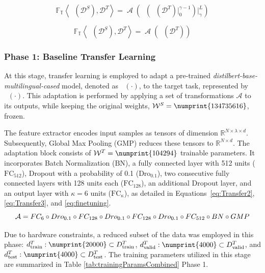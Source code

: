 \documentclass[runningheads]{llncs}
\newcommand{\modelohuggingface}{distilbert-base-multilingual-cased}
\DeclareMathOperator{\ypredtarget}{\phi^{T}}
\DeclareMathOperator{\ypredsource}{\phi^{S}}
\DeclareMathOperator{\ConvNetOut}{\mathcal{A}}
\begin{document}
\begin{equation}
    \mathbb{F_{T}} \left< \ypredsource(\mathcal{D}^{S}), \mathcal{D}^{T} \right> = \ConvNetOut \left( \ypredsource \left (\ypredsource(\mathcal{D}^{T}) \Bigr\rvert_{0}^{\gamma -1} \right)\Bigr\rvert_{\gamma}^{L}\right) 
    \label{eq:finetuningLenin}
\end{equation}


\begin{equation}\label{eq:finetuningTunstall}
    \mathbb{F_{T}} \left< \ypredsource(\mathcal{D}^{S}), \mathcal{D}^{T} \right> = \ConvNetOut \left(\ypredsource(\mathcal{D}^{T})\right)
  \end{equation}
  
\subsubsection{Phase 1: Baseline Transfer Learning}
\label{sec:phase-1:-baseline}

At this stage, transfer learning is employed to adapt a pre-trained
\emph{\modelohuggingface} model, denoted as $\ypredsource(\cdot)$, to
the target task, represented by $\ypredtarget(\cdot)$. This adaptation
is performed by applying a set of transformations $\mathcal{A}$ to its
outputs, while keeping the original weights,
$\mathcal{W}^S = \numprint{134735616}$, frozen.

The feature extractor encodes input samples as tensors of dimension
$\mathbb{R}^{N \times \lambda \times d}$. Subsequently, Global Max
Pooling ($\mathrm{GMP}$) reduces these tensors to
$\mathbb{R}^{N \times d}$. The adaptation block consists of
$\mathcal{W}^T = \numprint{104294}$ trainable parameters. It
incorporates Batch Normalization ($\mathrm{BN}$), a fully connected
layer with 512 units ($\mathrm{FC}_{512}$), Dropout with a probability
of 0.1 ($\mathrm{Dro}_{0.1}$), two consecutive fully connected layers
with 128 units each ($\mathrm{FC}_{128}$), an additional Dropout
layer, and an output layer with $\kappa = 6$ units
($\mathrm{FC}_\kappa$), as detailed in Equations~\eqref{eq:Transfer2},
\eqref{eq:Transfer3}, and \eqref{eq:finetuning}.
\begin{equation}
  \label{eq:finetuning}
    \mathcal{A} = FC_{6} \circ Dro_{0.1} \circ FC_{128}  \circ Dro_{0.1} \circ FC_{128} \\ 
    \circ Dro_{0.1} \circ FC_{512} \circ BN \circ GMP 
\end{equation}

Due to hardware constraints, a reduced subset of the data was employed
in this phase:
$d^T_{\text{train}}:\numprint{20000} \subset D^T_{\text{train}}$,
$d^T_{\text{valid}}:\numprint{4000} \subset D^T_{\text{valid}}$, and
$d^T_{\text{test}}:\numprint{4000} \subset D^T_{\text{test}}$. The
training parameters utilized in this stage are summarized in
Table \ref{tab:trainingParamsCombined} Phase 1.
\end{document}
